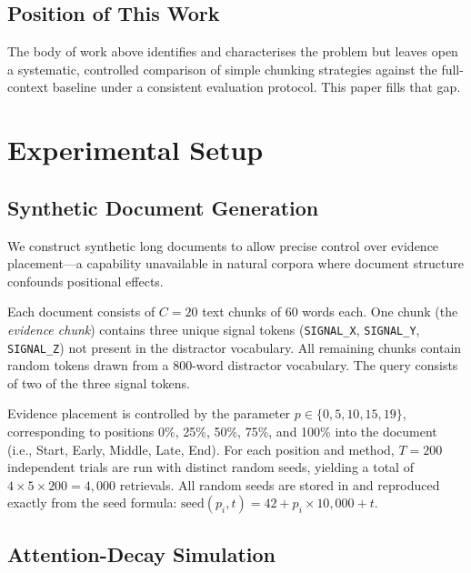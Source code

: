 \documentclass[sigconf,nonacm]{acmart}
\begin{document}
\subsection{Position of This Work}

The body of work above identifies and characterises the problem but leaves open
a systematic, controlled comparison of simple chunking strategies against the
full-context baseline under a consistent evaluation protocol.
This paper fills that gap.

\section{Experimental Setup}
\label{sec:methods}

\subsection{Synthetic Document Generation}
\label{sec:data}

We construct synthetic long documents to allow precise control over evidence
placement—a capability unavailable in natural corpora where document structure
confounds positional effects.

Each document consists of $C = 20$ text chunks of 60 words each.
One chunk (the \emph{evidence chunk}) contains three unique signal tokens
(\texttt{SIGNAL\_X}, \texttt{SIGNAL\_Y}, \texttt{SIGNAL\_Z}) not present in
the distractor vocabulary.
All remaining chunks contain random tokens drawn from a 800-word distractor vocabulary.
The query consists of two of the three signal tokens.

Evidence placement is controlled by the parameter $p \in \{0, 5, 10, 15, 19\}$,
corresponding to positions 0\%, 25\%, 50\%, 75\%, and 100\% into the document
(i.e., Start, Early, Middle, Late, End).
For each position and method, $T = 200$ independent trials are run with distinct
random seeds, yielding a total of $4 \times 5 \times 200 = 4{,}000$ retrievals.
All random seeds are stored in  and reproduced exactly
from the seed formula: $\text{seed}(p_i, t) = 42 + p_i \times 10{,}000 + t$.

\subsection{Attention-Decay Simulation}
\label{sec:attn}
\end{document}
